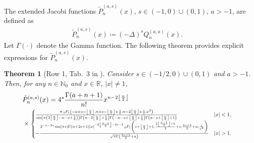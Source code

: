 \documentclass[10pt,a4paper]{article}
\newcommand{\eP}{\tilde{P}}
\newtheorem{theorem}{Theorem}[section]
\numberwithin{equation}{section}
\begin{document}
The extended Jacobi functions $\eP^{(a,s)}_n(x)$, $s \in (-1, 0) \cup (0,1)$, $a>-1$, are defined as
\begin{align}
\eP^{(a,s)}_n(x) \coloneqq (-\Delta)^s Q^{(a,a)}_n(x). 
\label{def:extended-Jacobi}
\end{align}
Let $\Gamma(\cdot)$ denote the Gamma function. The following theorem provides explicit expressions for $\eP^{(a,s)}_n(x)$.
\begin{theorem}[Row 1, Tab.~3 in \cite{Gutleb2023}]
Consider $s \in (-1/2,0)\cup (0,1)$ and $a > -1$. Then, for any  $n \in \mathbb{N}_0$  and $x \in \mathbb{R}$, $|x| \neq 1$,
\begin{align}
\begin{split}
&\eP^{(a,s)}_n(x)
=
4^{s}\frac{\Gamma (a+n+1)}{n!} x^{n-2 \left\lfloor \frac{n}{2}\right\rfloor }\\
&\times
\resizebox{0.85\textwidth}{!}{$
\begin{cases}
\footnotesize
\frac{\pi \, {}_2F_1\left(-a+s-\left\lfloor \frac{n}{2}\right\rfloor, n+s-\left\lfloor \frac{n}{2}\right\rfloor +\frac{1}{2};n-2 \left\lfloor \frac{n}{2}\right\rfloor +\frac{1}{2};x^2\right)}{\sin \left(\pi  \left(2 \left\lfloor \frac{n}{2}\right\rfloor - n- s+\frac{1}{2}\right)\right)\Gamma \left(n-2 \left\lfloor \frac{n}{2}\right\rfloor +\frac{1}{2}\right) \Gamma \left(-n-s+\left\lfloor \frac{n}{2}\right\rfloor +\frac{1}{2}\right) \Gamma \left(a-s+\left\lfloor \frac{n}{2}\right\rfloor +1\right)} & |x|<1,  \\
-\frac{2^{-n-2 s} \sin (\pi  s) \Gamma (n+2 s+1) | x| ^{-2 \left\lfloor \frac{n-1}{2}\right\rfloor -2 s-3} \, _2F_1\left(s+\left\lfloor \frac{n}{2}\right\rfloor +1,\frac{2 \left\lfloor \frac{n-1}{2}\right\rfloor +3}{2} +s;\frac{2 n+3}{2}+a;\frac{1}{x^2}\right)}{\sqrt{\pi } \Gamma \left(\frac{2 n+3}{2} +a\right)} & |x|>1. \end{cases}$}
\end{split}
\label{eq:extendedJacobidef}
\end{align}
\end{theorem}
\end{document}
